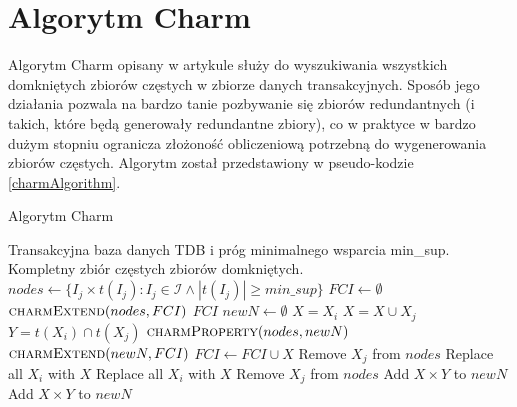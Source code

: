 \section{Algorytm Charm}

Algorytm Charm opisany w artykule \cite{charmArt} służy do wyszukiwania wszystkich domkniętych zbiorów częstych w zbiorze danych transakcyjnych. Sposób jego działania pozwala na bardzo tanie pozbywanie się zbiorów redundantnych (i takich, które będą generowały redundantne zbiory), co w praktyce w bardzo dużym stopniu ogranicza złożoność obliczeniową potrzebną do wygenerowania zbiorów częstych. Algorytm został przedstawiony w pseudo-kodzie \ref{charmAlgorithm}.

\begin{algorithm}
\caption{Algorytm Charm}
\label{charmAlgorithm}
\renewcommand{\algorithmicrequire}{\textbf{Wejście:}}
\renewcommand{\algorithmicensure}{\textbf{Wyjście:}}
\begin{algorithmic}
	\Require Transakcyjna baza danych TDB i próg minimalnego wsparcia min\_sup.
	\Ensure  Kompletny zbiór częstych zbiorów domkniętych.
		\State $nodes \gets \{I_{j} \times t(I_{j}) : I_{j} \in \mathcal{I} \wedge |t(I_{j})| \ge min\_sup \} $
		\State $FCI \gets \emptyset$ 
		\State $\Call{charmExtend}{nodes, FCI}$
		\State \Return $FCI$
	\EndFunction
			\State $newN \gets \emptyset$
			\State $X = X_{i}$
			 
				\State $X = X \cup X_{j}$
				\State $Y = t(X_{i}) \cap t(X_{j})$
				\State $\Call{charmProperty}{nodes, newN}$
			\EndFor
				\State $\Call{charmExtend}{newN, FCI}$
			\EndIf
			\State $FCI \gets FCI \cup X$
		\EndFor
	\EndFunction
				\State Remove $X_{j}$ from $nodes$
				\State Replace all $X_{i}$ with $X$
				\State Replace all $X_{i}$ with $X$
				\State Remove $X_{j}$ from $nodes$
				\State Add $X \times Y$ to $newN$
				\State Add $X \times Y$ to $newN$
			\EndIf
		\EndIf
	\EndFunction
\end{algorithmic}
\end{algorithm}

